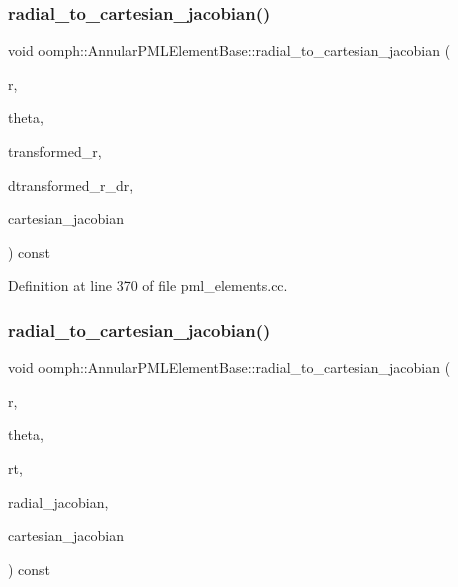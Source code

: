 \subsubsection{\texorpdfstring{radial\+\_\+to\+\_\+cartesian\+\_\+jacobian()}{radial\_to\_cartesian\_jacobian()}\hspace{0.1cm}{\footnotesize\ttfamily [1/2]}}
{\footnotesize\ttfamily void oomph\+::\+Annular\+P\+M\+L\+Element\+Base\+::radial\+\_\+to\+\_\+cartesian\+\_\+jacobian (\begin{DoxyParamCaption}\item[{const double \&}]{r,  }\item[{const double \&}]{theta,  }\item[{const std\+::complex$<$ double $>$ \&}]{transformed\+\_\+r,  }\item[{const std\+::complex$<$ double $>$ \&}]{dtransformed\+\_\+r\+\_\+dr,  }\item[{\hyperlink{classoomph_1_1DenseComplexMatrix}{Dense\+Complex\+Matrix} \&}]{cartesian\+\_\+jacobian }\end{DoxyParamCaption}) const}



Definition at line 370 of file pml\+\_\+elements.\+cc.

\mbox{\label{classoomph_1_1AnnularPMLElementBase_a584becc7b1b83823c334704117b3de12}} 
\subsubsection{\texorpdfstring{radial\+\_\+to\+\_\+cartesian\+\_\+jacobian()}{radial\_to\_cartesian\_jacobian()}\hspace{0.1cm}{\footnotesize\ttfamily [2/2]}}
{\footnotesize\ttfamily void oomph\+::\+Annular\+P\+M\+L\+Element\+Base\+::radial\+\_\+to\+\_\+cartesian\+\_\+jacobian (\begin{DoxyParamCaption}\item[{const double \&}]{r,  }\item[{const double \&}]{theta,  }\item[{const std\+::complex$<$ double $>$ \&}]{rt,  }\item[{const \hyperlink{classoomph_1_1DenseComplexMatrix}{Dense\+Complex\+Matrix} \&}]{radial\+\_\+jacobian,  }\item[{\hyperlink{classoomph_1_1DenseComplexMatrix}{Dense\+Complex\+Matrix} \&}]{cartesian\+\_\+jacobian }\end{DoxyParamCaption}) const}



